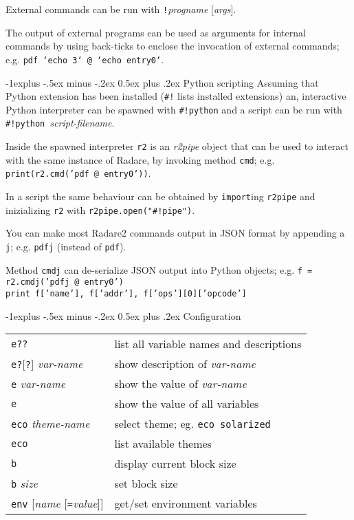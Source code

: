\documentclass[a4paper,landscape]{article}
\makeatletter
\renewcommand{\subsection}{\@startsection{subsection}{2}{0mm}%
                                {-1explus -.5ex minus -.2ex}%
                                {0.5ex plus .2ex}%
                                {\normalfont\normalsize\bfseries}}
\makeatother
\begin{document}
\begin{multicols*}{3}
External commands can be run with \texttt{!}\textit{progname} [\textit{args}].

The output of external programs can be used as arguments for internal commands by using back-ticks to enclose the invocation of external commands; e.g. \texttt{pdf `echo 3` @ `echo entry0`}.

\subsection{Python scripting}
Assuming that Python extension has been installed (\texttt{\#!} lists installed extensions)
an, interactive Python interpreter can be spawned with \texttt{\#!python} and a script can
be run with \texttt{\#!python }\textit{script-filename}.

Inside the spawned interpreter \texttt{r2} is an \emph{r2pipe} object that can be used to interact with
the same instance of Radare, by invoking method \texttt{cmd}; e.g. \texttt{print(r2.cmd('pdf @ entry0'))}.

In a script the same behaviour can be obtained by \texttt{import}ing \texttt{r2pipe} and inizializing \texttt{r2} with \texttt{r2pipe.open("\#!pipe")}.

You can make most Radare2 commands output in JSON format by appending a \texttt{j}; e.g. \texttt{pdfj} (instead of \texttt{pdf}).

Method \texttt{cmdj} can de-serialize JSON output into Python objects; e.g. \texttt{f = r2.cmdj('pdfj @ entry0')} \\ \texttt{print f['name'], f['addr'], f['ops'][0]['opcode']}

\subsection{Configuration}
\begin{tabular}{@{}ll@{}}
\texttt{e??} & list all variable names and descriptions \\
\texttt{e?}[\texttt{?}] \textit{var-name} & show description of \textit{var-name}\\
\texttt{e} \textit{var-name} & show the value of \textit{var-name} \\
\texttt{e} & show the value of all variables \\
\texttt{eco} \textit{theme-name} & select theme; eg. \texttt{eco solarized} \\
\texttt{eco} & list available themes \\
\texttt{b} & display current block size \\
\texttt{b} \textit{size} & set block size \\
\texttt{env} [\textit{name} [\texttt{=}\textit{value}]] & get/set environment variables \\
\end{tabular}

\end{multicols*}
\end{document}
